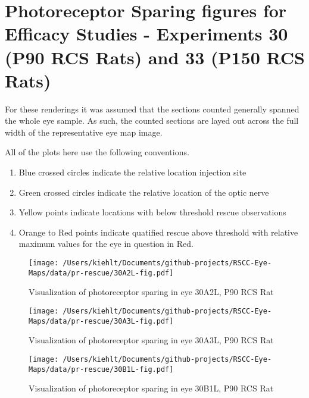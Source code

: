 \documentclass{article}
\begin{document}
\pagebreak




\section{Photoreceptor Sparing figures for Efficacy Studies - Experiments 30 (P90 RCS Rats) and 33 (P150 RCS Rats)}
For these renderings it was assumed that the sections counted generally spanned the whole eye sample. As such, the counted sections are layed out across the full width of the representative eye map image.

All of the plots here use the following conventions. 
\begin{enumerate}
\item Blue crossed circles indicate the relative location injection site
\item Green crossed circles indicate the relative location of the optic nerve
\item Yellow points indicate locations with below threshold rescue observations
\item Orange to Red points indicate quatified rescue above threshold with relative maximum values for the eye in question in Red.
\end{enumerate}
\begin{center}
\begin{figure}
\texttt{[image: /Users/kiehlt/Documents/github-projects/RSCC-Eye-Maps/data/pr-rescue/30A2L-fig.pdf]}
\caption{Visualization of photoreceptor sparing in eye 30A2L, P90 RCS Rat}
\label{fig:30A2L}
\end{figure}

\end{center}
\begin{center}
\begin{figure}
\texttt{[image: /Users/kiehlt/Documents/github-projects/RSCC-Eye-Maps/data/pr-rescue/30A3L-fig.pdf]}
\caption{Visualization of photoreceptor sparing in eye 30A3L, P90 RCS Rat}
\label{fig:30A3L}
\end{figure}

\end{center}
\begin{center}
\begin{figure}
\texttt{[image: /Users/kiehlt/Documents/github-projects/RSCC-Eye-Maps/data/pr-rescue/30B1L-fig.pdf]}
\caption{Visualization of photoreceptor sparing in eye 30B1L, P90 RCS Rat}
\label{fig:30B1L}
\end{figure}

\end{center}
\end{document}
